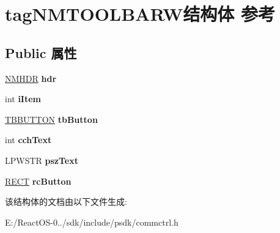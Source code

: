 \hypertarget{structtag_n_m_t_o_o_l_b_a_r_w}{}\section{tag\+N\+M\+T\+O\+O\+L\+B\+A\+R\+W结构体 参考}
\label{structtag_n_m_t_o_o_l_b_a_r_w}
\subsection*{Public 属性}
\begin{DoxyCompactItemize}
\item 
\mbox{\label{structtag_n_m_t_o_o_l_b_a_r_w_a6a279b7b952f02b480a4b26324af7f37}} 
\hyperlink{structtag_n_m_h_d_r}{N\+M\+H\+DR} {\bfseries hdr}
\item 
\mbox{\label{structtag_n_m_t_o_o_l_b_a_r_w_a5f33b0a185a6ae2819187f6f8034b46b}} 
int {\bfseries i\+Item}
\item 
\mbox{\label{structtag_n_m_t_o_o_l_b_a_r_w_a34a343b8ef61a07221576e66fa3246b8}} 
\hyperlink{struct___t_b_b_u_t_t_o_n}{T\+B\+B\+U\+T\+T\+ON} {\bfseries tb\+Button}
\item 
\mbox{\label{structtag_n_m_t_o_o_l_b_a_r_w_a89a6f0c50c3941b55f270e00e692b333}} 
int {\bfseries cch\+Text}
\item 
\mbox{\label{structtag_n_m_t_o_o_l_b_a_r_w_a32704692fa1191c12e5f51d72e029616}} 
L\+P\+W\+S\+TR {\bfseries psz\+Text}
\item 
\mbox{\label{structtag_n_m_t_o_o_l_b_a_r_w_aad6063b30b0ea5b2dbe5a06469ed1494}} 
\hyperlink{structtag_r_e_c_t}{R\+E\+CT} {\bfseries rc\+Button}
\end{DoxyCompactItemize}


该结构体的文档由以下文件生成\+:\begin{DoxyCompactItemize}
\item 
E\+:/\+React\+O\+S-\/0../sdk/include/psdk/commctrl.\+h\end{DoxyCompactItemize}
